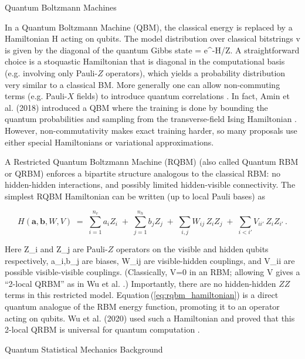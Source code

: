 Quantum Boltzmann Machines





In a Quantum Boltzmann Machine (QBM), the classical energy is replaced by a Hamiltonian H acting on qubits.  The model distribution over classical bitstrings v is given by the diagonal of the quantum Gibbs state \rho = e^{-H}/Z.  A straightforward choice is a stoquastic Hamiltonian that is diagonal in the computational basis (e.g. involving only Pauli-$Z$ operators), which yields a probability distribution very similar to a classical BM.  More generally one can allow non-commuting terms (e.g. Pauli-$X$ fields) to introduce quantum correlations .  In fact, Amin et al. (2018) introduced a QBM where the training is done by bounding the quantum probabilities and sampling from the transverse-field Ising Hamiltonian .  However, non-commutativity makes exact training harder, so many proposals use either special Hamiltonians or variational approximations.



A Restricted Quantum Boltzmann Machine (RQBM) (also called Quantum RBM or QRBM) enforces a bipartite structure analogous to the classical RBM: no hidden-hidden interactions, and possibly limited hidden-visible connectivity.  The simplest RQBM Hamiltonian can be written (up to local Pauli bases) as

\[

\label{eq:rqbm_hamiltonian}

H(\mathbf{a},\mathbf{b},W,V) \;=\; \sum_{i=1}^{n_v} a_i Z_i \;+\; \sum_{j=1}^{n_h} b_j Z_j \;+\; \sum_{i,j} W_{ij}\, Z_i Z_j \;+\; \sum_{i<i{\prime}} V_{ii{\prime}}\, Z_i Z_{i{\prime}} \,.

\]

Here Z_i and Z_j are Pauli-$Z$ operators on the visible and hidden qubits respectively, a_i,b_j are biases, W_{ij} are visible-hidden couplings, and V_{ii{\prime}} are possible visible-visible couplings.  (Classically, V=0 in an RBM; allowing V gives a “2-local QRBM” as in Wu et al. .)  Importantly, there are no hidden-hidden $ZZ$ terms in this restricted model.  Equation (\ref{eq:rqbm_hamiltonian}) is a direct quantum analogue of the RBM energy function, promoting it to an operator acting on qubits.  Wu et al. (2020) used such a Hamiltonian and proved that this 2-local QRBM is universal for quantum computation .





Quantum Statistical Mechanics Background





